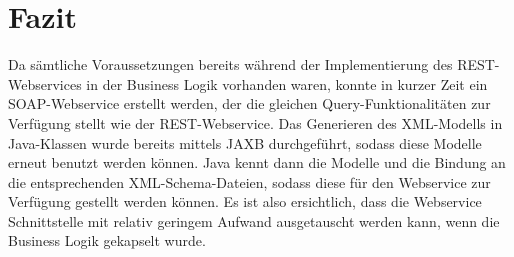  \section{Fazit}
 
Da sämtliche Voraussetzungen bereits während der Implementierung des REST-Webservices in der Business Logik vorhanden waren, konnte in kurzer Zeit ein SOAP-Webservice erstellt werden, der die gleichen Query-Funktionalitäten zur Verfügung stellt wie der REST-Webservice. Das Generieren des XML-Modells in Java-Klassen wurde bereits mittels JAXB durchgeführt, sodass diese Modelle erneut benutzt werden können. Java kennt dann die Modelle und die Bindung an die entsprechenden XML-Schema-Dateien, sodass diese für den \gls{Webservice} zur Verfügung gestellt werden können. 
Es ist also ersichtlich, dass die Webservice Schnittstelle mit relativ geringem Aufwand ausgetauscht werden kann, wenn die Business Logik gekapselt wurde. 